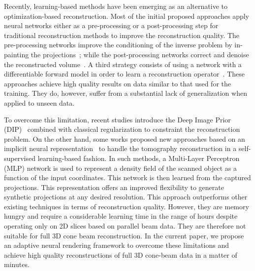 \documentclass[acmtog,nonacm]{acmart} \acmSubmissionID{0438}
\begin{document}
Recently, learning-based methods have been emerging as an alternative
to optimization-based reconstruction. Most of the initial proposed
approaches apply neural networks either as a pre-processing or a
post-processing step for traditional reconstruction methods to improve
the reconstruction quality. The pre-processing networks improve the
conditioning of the inverse problem by in-painting the
projections~\cite{anirudh2018lose, ghani2018deep, yoo2019sinogram,
  tang2019projection}; while the post-processing networks correct and
denoise the reconstructed volume~\cite{pelt2018improving,
  lucas2018using, liu2020tomogan}. A third strategy consists of using
a network with a differentiable forward model in order to learn a
reconstruction operator~\cite{adler2018learned, chen2018learn,
  kang2018deep, he2020radon}. These approaches achieve high quality
results on data similar to that used for the training. They do,
however, suffer from a substantial lack of generalization when applied
to unseen data.

To overcome this limitation, recent studies introduce the Deep Image
Prior (DIP)~\cite{baguer2020computed, barutcu2021limited} combined
with classical regularization to constraint the reconstruction
problem. On the other hand, some works proposed new approaches based
on an implicit neural representation~\cite{zang2021intratomo,
sun2021coil} to handle the tomography reconstruction in a
self-supervised learning-based fashion. In such methods, a Multi-Layer
Perceptron (MLP) network is used to represent a density field of the
scanned object as a function of the input coordinates. This network is
then learned from the captured projections. This representation offers
an improved flexibility to generate synthetic projections at any
desired resolution. This approach outperforms other existing
techniques in terms of reconstruction quality. However, they are
memory hungry and require a considerable learning time in the range of
hours despite operating only on 2D slices based on parallel beam
data. They are therefore not suitable for full 3D cone beam
reconstruction. In the current paper, we propose an adaptive neural
rendering framework to overcome these limitations and achieve high
quality reconstructions of full 3D cone-beam data in a matter of
minutes.
\end{document}
